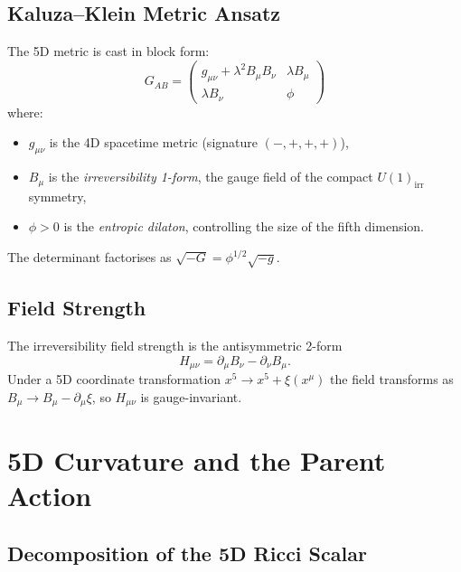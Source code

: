 \documentclass[12pt,a4paper]{article}
\newcommand{\gm}{g_{\mu\nu}}       %
\newcommand{\lam}{\lambda}         %
\begin{document}
\subsection{Kaluza--Klein Metric Ansatz}

The 5D metric is cast in block form:
\begin{equation}
  \boxed{
  G_{AB} = \begin{pmatrix}
    \gm + \lam^2 B_\mu B_\nu & \lam B_\mu \\[4pt]
    \lam B_\nu               & \phi
  \end{pmatrix}
  }
  \label{eq:KK-metric}
\end{equation}
where:
\begin{itemize}
  \item $\gm$ is the 4D spacetime metric (signature $(-,+,+,+)$),
  \item $B_\mu$ is the \emph{irreversibility 1-form}, the gauge field of
        the compact $U(1)_{\text{irr}}$ symmetry,
  \item $\phi > 0$ is the \emph{entropic dilaton}, controlling the size of
        the fifth dimension.
\end{itemize}

The determinant factorises as $\sqrt{-G} = \phi^{1/2}\sqrt{-g}$.

\subsection{Field Strength}

The irreversibility field strength is the antisymmetric 2-form
\begin{equation}
  H_{\mu\nu} = \partial_\mu B_\nu - \partial_\nu B_\mu .
  \label{eq:field-strength}
\end{equation}
Under a 5D coordinate transformation $x^5 \to x^5 + \xi(x^\mu)$ the field
transforms as $B_\mu\to B_\mu - \partial_\mu\xi$, so $H_{\mu\nu}$ is
gauge-invariant.

\section{5D Curvature and the Parent Action}
\label{sec:5D-action}

\subsection{Decomposition of the 5D Ricci Scalar}
\end{document}
